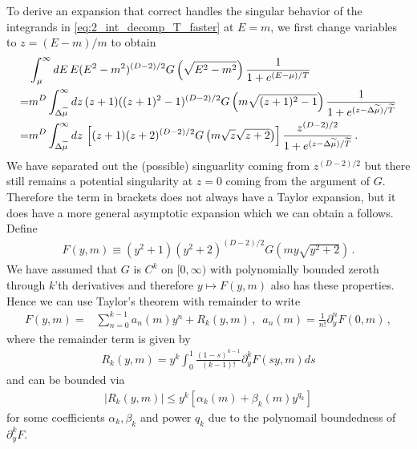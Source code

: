 \documentclass[sn-mathphys,Numbered]{sn-jnl}
\begin{document}
To derive an expansion that correct handles the singular behavior of the integrands in \eqref{eq:2_int_decomp_T_faster} at $E=m$, we first change variables to $z=(E-m)/m$  to obtain
\begin{align}
&\int_{\mu}^\infty dE\, E(E^2-m^2)^{(D-2)/2} G\left(\sqrt{E^2-m^2}\right)
    \frac{1}{1+e^{(E-\mu)/T}}\notag   \\
    =&m^{D}\int_{\Delta\widetilde{\mu}}^\infty dz\, (z+1)((z+1)^2-1)^{(D-2)/2} G\left(m\sqrt{(z+1)^2-1}\right)
    \frac{1}{1+e^{(z-\Delta\widetilde{\mu})/\widetilde{T}}} \notag\\
        =&m^{D}\int_{\Delta\widetilde{\mu}}^\infty dz\, \left[(z+1)(  z+2)^{(D-2)/2} G\left(m\sqrt{z}\sqrt{z+2}\right)\right]
    \frac{z^{(D-2)/2}}{1+e^{(z-\Delta\widetilde{\mu})/\widetilde{T}}} \,.\label{eq:T_faster_int_1_change_vars}
\end{align}
We have separated out the (possible) singuarlity coming from $z^{(D-2)/2}$ but there still remains a potential singularity at $z=0$ coming from the argument of  $G$. Therefore the term in brackets does not always have a Taylor expansion, but it does have a more general asymptotic expansion which we can obtain a follows.  Define  
\begin{align}\label{eq:F_y_m_def}
  F(y,m)\equiv  (y^2+1)(  y^2+2)^{(D-2)/2} G\left(my\sqrt{y^2+2}\right)\,.
\end{align}
We have assumed that $G$ is $C^k$ on $[0,\infty)$ with polynomially bounded zeroth through $k$'th derivatives and therefore $y\mapsto F(y,m)$ also has these properties.   Hence we can use Taylor's theorem with remainder to write
\begin{align}\label{eq:F_y_m_Taylor}
F(y,m)=&\sum_{n=0}^{k-1} a_n(m)y^n +R_k(y,m)\,, \,\,\,a_n(m)=\frac{1}{n!}\partial_y^n F(0,m)\,,
\end{align}
where the remainder term is given by
\begin{align}
R_k(y,m)=y^k \int_0^1\frac{(1-s)^{k-1}}{(k-1)!}\partial_y^k F(sy,m)ds
\end{align}
and can be bounded via
\begin{align}\label{eq:R_k_poly_bound}
|R_k(y,m)|\leq y^k[\alpha_k(m)+\beta_k(m)y^{q_k}]
\end{align}
for some coefficients $\alpha_k,\beta_k$ and power $q_k$ due to the polynomail boundedness of $\partial_y^k F$.
\end{document}
